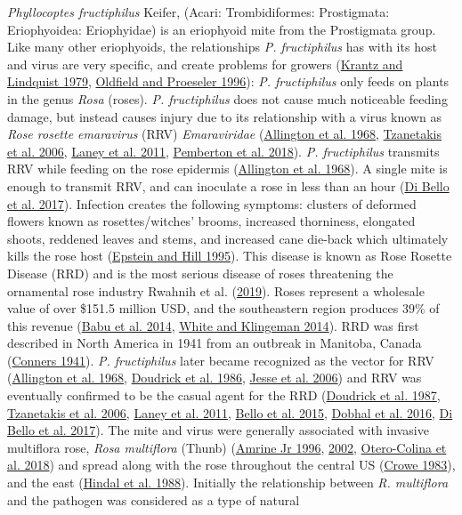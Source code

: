 \documentclass{ufdissertation}[overrideChapters] %
\begin{document}
{\emph{Phyllocoptes fructiphilus} Keifer, (Acari: Trombidiformes: Prostigmata: Eriophyoidea: Eriophyidae) is an eriophyoid mite from the Prostigmata group. Like many other eriophyoids, the relationships \emph{P. fructiphilus} has with its host and virus are very specific, and create problems for growers (\protect\hyperlink{ref-Krantz1979}{Krantz and Lindquist 1979}, \protect\hyperlink{ref-Oldfield1996a}{Oldfield and Proeseler 1996}): \emph{P. fructiphilus} only feeds on plants in the genus \emph{Rosa} (roses). \emph{P. fructiphilus} does not cause much noticeable feeding damage, but instead causes injury due to its relationship with a virus known as \emph{Rose rosette emaravirus} (RRV) \emph{Emaraviridae} (\protect\hyperlink{ref-Allington1968}{Allington et al. 1968}, \protect\hyperlink{ref-Tzanetakis2006}{Tzanetakis et al. 2006}, \protect\hyperlink{ref-Laney2011}{Laney et al. 2011}, \protect\hyperlink{ref-Pemberton2018}{Pemberton et al. 2018}). \emph{P. fructiphilus} transmits RRV while feeding on the rose epidermis (\protect\hyperlink{ref-Allington1968}{Allington et al. 1968}). A single mite is enough to transmit RRV, and can inoculate a rose in less than an hour (\protect\hyperlink{ref-Bello2017}{Di Bello et al. 2017}). Infection creates the following symptoms: clusters of deformed flowers known as rosettes/witches' brooms, increased thorniness, elongated shoots, reddened leaves and stems, and increased cane die-back which ultimately kills the rose host (\protect\hyperlink{ref-Epstein1995}{Epstein and Hill 1995}). This disease is known as Rose Rosette Disease (RRD) and is the most serious disease of roses threatening the ornamental rose industry Rwahnih et al. (\protect\hyperlink{ref-Rwahnih2019}{2019}). Roses represent a wholesale value of over \$151.5 million USD, and the southeastern region produces 39\% of this revenue (\protect\hyperlink{ref-Babu2014}{Babu et al. 2014}, \protect\hyperlink{ref-White2014}{White and Klingeman 2014}). RRD was first described in North America in 1941 from an outbreak in Manitoba, Canada (\protect\hyperlink{ref-Conners1941}{Conners 1941}). \emph{P. fructiphilus} later became recognized as the vector for RRV (\protect\hyperlink{ref-Allington1968}{Allington et al. 1968}, \protect\hyperlink{ref-Doudrick1986}{Doudrick et al. 1986}, \protect\hyperlink{ref-Jesse2006}{Jesse et al. 2006}) and RRV was eventually confirmed to be the casual agent for the RRD (\protect\hyperlink{ref-Doudrick1987}{Doudrick et al. 1987}, \protect\hyperlink{ref-Tzanetakis2006}{Tzanetakis et al. 2006}, \protect\hyperlink{ref-Laney2011}{Laney et al. 2011}, \protect\hyperlink{ref-Bello2015}{Bello et al. 2015}, \protect\hyperlink{ref-Dobhal2016}{Dobhal et al. 2016}, \protect\hyperlink{ref-Bello2017}{Di Bello et al. 2017}). The mite and virus were generally associated with invasive multiflora rose, \emph{Rosa multiflora} (Thunb) (\protect\hyperlink{ref-Amrine1996}{Amrine Jr 1996}, \protect\hyperlink{ref-Amrine2002}{2002}, \protect\hyperlink{ref-Otero-Colina2018}{Otero-Colina et al. 2018}) and spread along with the rose throughout the central US (\protect\hyperlink{ref-Crowe1983}{Crowe 1983}), and the east (\protect\hyperlink{ref-Hindal1988}{Hindal et al. 1988}). Initially the relationship between \emph{R. multiflora} and the pathogen was considered as a type of natural }
\end{document}
